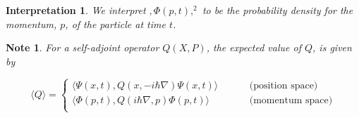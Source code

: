 \documentclass[12pt]{amsart}
\newtheorem{intp}[thm]{Interpretation}
\newtheorem{note}[thm]{Note}
\renewcommand{\r}{\rangle}
\renewcommand{\l}{\langle}
\begin{document}
\begin{intp}
	We interpret $, \Phi (p,t) ,^2$ to be the probability density for the momentum, $p$, of the particle at time $t$.  
\end{intp}

\begin{note}
	For a self-adjoint operator $Q(X,P)$, the expected value of $Q$,  is given by 
	
	\[ 
	\l Q \r = 
	\begin{cases}
		\l \Psi(x,t) , Q(x, -i\hbar \nabla) \Psi(x,t)\r & \hspace{1cm} \text{(position space)}\\
		\l \Phi(p,t) , Q(i\hbar \nabla, p) \Phi(p,t) \r & \hspace{1cm} \text{(momentum space)}\\
	\end{cases}
	\]
\end{note}
\end{document}
